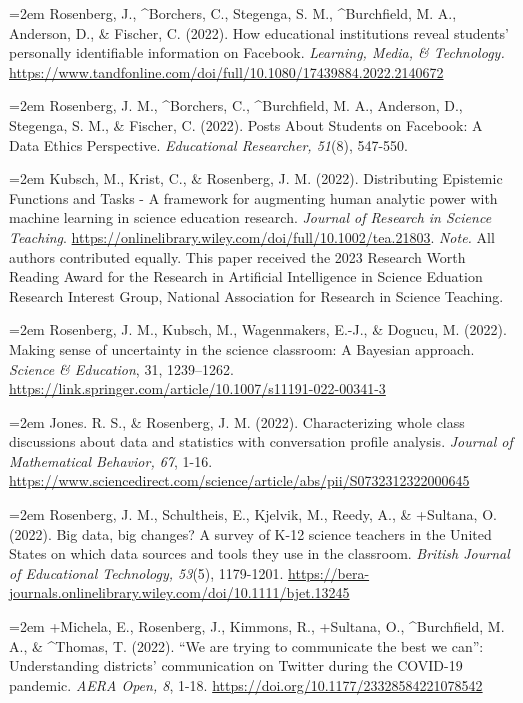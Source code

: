 \documentclass[
  14,
]{article}
\begin{document}
\hangindent=2em Rosenberg, J., \^{}Borchers, C., Stegenga, S. M.,
\^{}Burchfield, M. A., Anderson, D., \& Fischer, C. (2022). How
educational institutions reveal students' personally identifiable
information on Facebook. \emph{Learning, Media, \& Technology.}
\url{https://www.tandfonline.com/doi/full/10.1080/17439884.2022.2140672}

\hangindent=2em Rosenberg, J. M., \^{}Borchers, C., \^{}Burchfield, M.
A., Anderson, D., Stegenga, S. M., \& Fischer, C. (2022). Posts About
Students on Facebook: A Data Ethics Perspective. \emph{Educational
Researcher, 51}(8), 547-550.

\hangindent=2em Kubsch, M., Krist, C., \& Rosenberg, J. M. (2022).
Distributing Epistemic Functions and Tasks - A framework for augmenting
human analytic power with machine learning in science education
research. \emph{Journal of Research in Science Teaching}.
\url{https://onlinelibrary.wiley.com/doi/full/10.1002/tea.21803}.
\emph{Note.} All authors contributed equally. This paper received the
2023 Research Worth Reading Award for the Research in Artificial
Intelligence in Science Eduation Research Interest Group, National
Association for Research in Science Teaching.

\hangindent=2em Rosenberg, J. M., Kubsch, M., Wagenmakers, E.-J., \&
Dogucu, M. (2022). Making sense of uncertainty in the science classroom:
A Bayesian approach. \emph{Science \& Education}, 31, 1239--1262.
\url{https://link.springer.com/article/10.1007/s11191-022-00341-3}

\hangindent=2em Jones. R. S., \& Rosenberg, J. M. (2022). Characterizing
whole class discussions about data and statistics with conversation
profile analysis. \emph{Journal of Mathematical Behavior, 67}, 1-16.
\url{https://www.sciencedirect.com/science/article/abs/pii/S0732312322000645}

\hangindent=2em Rosenberg, J. M., Schultheis, E., Kjelvik, M., Reedy,
A., \& +Sultana, O. (2022). Big data, big changes? A survey of K-12
science teachers in the United States on which data sources and tools
they use in the classroom. \emph{British Journal of Educational
Technology, 53}(5), 1179-1201.
\url{https://bera-journals.onlinelibrary.wiley.com/doi/10.1111/bjet.13245}

\hangindent=2em +Michela, E., Rosenberg, J., Kimmons, R., +Sultana, O.,
\^{}Burchfield, M. A., \& \^{}Thomas, T. (2022). ``We are trying to
communicate the best we can'': Understanding districts' communication on
Twitter during the COVID-19 pandemic. \emph{AERA Open, 8}, 1-18.
\url{https://doi.org/10.1177/23328584221078542}
\end{document}
